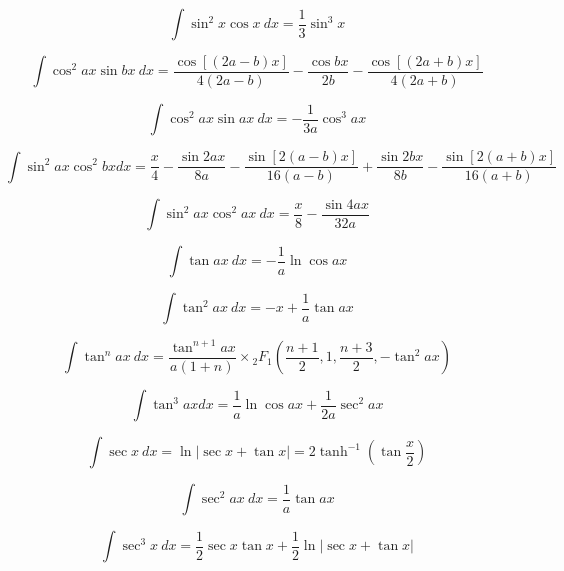 \documentclass[12pt,letterpaper,leqno]{article}
\begin{document}
\begin{equation}
\int \sin^2 x \cos x\ dx = \frac{1}{3} \sin^3 x
\end{equation}

\begin{equation}
\int \cos^2 ax \sin bx\ dx = \frac{\cos[(2a-b)x]}{4(2a-b)} 
- \frac{\cos bx}{2b}
 - \frac{\cos[(2a+b)x]}{4(2a+b)}
\end{equation}

\begin{equation}
\int \cos^2 ax \sin ax\ dx = -\frac{1}{3a}\cos^3{ax} 
\end{equation}

\begin{equation}
\int \sin^2 ax \cos^2 bx dx = \frac{x}{4}
-\frac{\sin 2ax}{8a}-
\frac{\sin[2(a-b)x]}{16(a-b)}
+\frac{\sin 2bx}{8b}-
\frac{\sin[2(a+b)x]}{16(a+b)}
\end{equation}

\begin{equation}
\int \sin^2 ax \cos^2 ax\ dx = \frac{x}{8}-\frac{\sin 4ax}{32a}
\end{equation}

\begin{equation}
\int \tan ax\ dx = -\frac{1}{a} \ln \cos ax 
\end{equation}

\begin{equation}
\int \tan^2 ax\ dx = -x + \frac{1}{a} \tan ax 
\end{equation}

\begin{equation}
\int \tan^n ax\ dx = 
\frac{\tan^{n+1} ax }{a(1+n)} \times
 {_2}F_1\left( \frac{n+1}{2}, 
1, \frac{n+3}{2}, -\tan^2 ax \right) 
\end{equation}

\begin{equation}
\int \tan^3 ax dx = \frac{1}{a} \ln \cos ax + \frac{1}{2a}\sec^2 ax 
\end{equation}

\begin{equation}
\int \sec x \ dx = \ln | \sec x + \tan x | = 2 \tanh^{-1} \left (\tan \frac{x}{2} \right) 
\end{equation}

\begin{equation}
\int \sec^2 ax\ dx = \frac{1}{a} \tan ax 
\end{equation}

\begin{equation}\label{eq:Kloeppel}
\int \sec^3 x \ {dx} = \frac{1}{2} \sec x \tan x + \frac{1}{2}\ln | \sec x + \tan x |
\end{equation}
\end{document}
